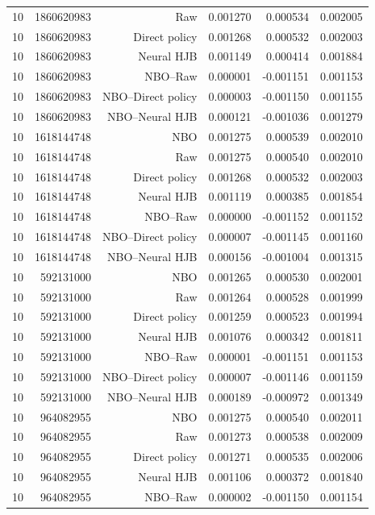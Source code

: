 \begin{longtable}{lrrrrr}
10 & 1860620983 & Raw & 0.001270 & 0.000534 & 0.002005 \\
10 & 1860620983 & Direct policy & 0.001268 & 0.000532 & 0.002003 \\
10 & 1860620983 & Neural HJB & 0.001149 & 0.000414 & 0.001884 \\
10 & 1860620983 & NBO--Raw & 0.000001 & -0.001151 & 0.001153 \\
10 & 1860620983 & NBO--Direct policy & 0.000003 & -0.001150 & 0.001155 \\
10 & 1860620983 & NBO--Neural HJB & 0.000121 & -0.001036 & 0.001279 \\
10 & 1618144748 & NBO & 0.001275 & 0.000539 & 0.002010 \\
10 & 1618144748 & Raw & 0.001275 & 0.000540 & 0.002010 \\
10 & 1618144748 & Direct policy & 0.001268 & 0.000532 & 0.002003 \\
10 & 1618144748 & Neural HJB & 0.001119 & 0.000385 & 0.001854 \\
10 & 1618144748 & NBO--Raw & 0.000000 & -0.001152 & 0.001152 \\
10 & 1618144748 & NBO--Direct policy & 0.000007 & -0.001145 & 0.001160 \\
10 & 1618144748 & NBO--Neural HJB & 0.000156 & -0.001004 & 0.001315 \\
10 & 592131000 & NBO & 0.001265 & 0.000530 & 0.002001 \\
10 & 592131000 & Raw & 0.001264 & 0.000528 & 0.001999 \\
10 & 592131000 & Direct policy & 0.001259 & 0.000523 & 0.001994 \\
10 & 592131000 & Neural HJB & 0.001076 & 0.000342 & 0.001811 \\
10 & 592131000 & NBO--Raw & 0.000001 & -0.001151 & 0.001153 \\
10 & 592131000 & NBO--Direct policy & 0.000007 & -0.001146 & 0.001159 \\
10 & 592131000 & NBO--Neural HJB & 0.000189 & -0.000972 & 0.001349 \\
10 & 964082955 & NBO & 0.001275 & 0.000540 & 0.002011 \\
10 & 964082955 & Raw & 0.001273 & 0.000538 & 0.002009 \\
10 & 964082955 & Direct policy & 0.001271 & 0.000535 & 0.002006 \\
10 & 964082955 & Neural HJB & 0.001106 & 0.000372 & 0.001840 \\
10 & 964082955 & NBO--Raw & 0.000002 & -0.001150 & 0.001154 \\

\end{longtable}
